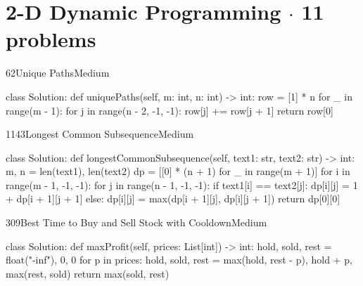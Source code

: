 \section{2-D Dynamic Programming \texorpdfstring{{\normalsize\color{muted}$\cdot$ 11 problems}}{- 11 problems}}

\begin{problem}{62}{Unique Paths}{Medium}
\begin{code}
class Solution:
    def uniquePaths(self, m: int, n: int) -> int:
        row = [1] * n
        for _ in range(m - 1):
            for j in range(n - 2, -1, -1):
                row[j] += row[j + 1]
        return row[0]
\end{code}
\end{problem}

\begin{problem}{1143}{Longest Common Subsequence}{Medium}
\begin{code}
class Solution:
    def longestCommonSubsequence(self, text1: str, text2: str) -> int:
        m, n = len(text1), len(text2)
        dp = [[0] * (n + 1) for _ in range(m + 1)]
        for i in range(m - 1, -1, -1):
            for j in range(n - 1, -1, -1):
                if text1[i] == text2[j]:
                    dp[i][j] = 1 + dp[i + 1][j + 1]
                else:
                    dp[i][j] = max(dp[i + 1][j], dp[i][j + 1])
        return dp[0][0]
\end{code}
\end{problem}

\begin{problem}{309}{Best Time to Buy and Sell Stock with Cooldown}{Medium}
\begin{code}
class Solution:
    def maxProfit(self, prices: List[int]) -> int:
        hold, sold, rest = float("-inf"), 0, 0
        for p in prices:
            hold, sold, rest = max(hold, rest - p), hold + p, max(rest, sold)
        return max(sold, rest)
\end{code}
\end{problem}

